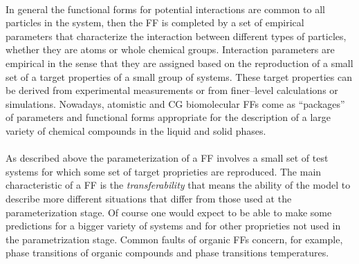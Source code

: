 \paragraph{\textbf{}} In general the functional forms for potential interactions are common to all particles in the system, then the \ac{FF} is completed by a set of empirical parameters that characterize the interaction between different types of particles, whether they are atoms or whole chemical groups. Interaction parameters are empirical in the sense that they are assigned based on the reproduction of a small set of a target properties of a small group of systems. These target properties can be derived from experimental measurements or from finer--level calculations or simulations. Nowadays, atomistic and \ac{CG} biomolecular \acp{FF} come as ``packages'' of parameters and functional forms appropriate for the description of a large variety of chemical compounds in the liquid and solid phases.

\paragraph{\textbf{}} As described above the parameterization of a \ac{FF} involves a small set of test systems for which some set of target proprieties are reproduced. The main characteristic of a \ac{FF} is the \textit{transferability} that means the ability of the model to describe more different situations that differ from those used at the parameterization stage. Of course one would expect to be able to make some predictions for a bigger variety of systems and for other proprieties not used in the parametrization stage. Common faults of organic \acp{FF} concern, for example, phase transitions of organic compounds and phase transitions temperatures.

